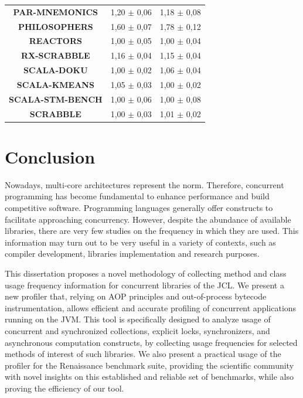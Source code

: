 \documentclass[]{usiinfthesis}
\begin{document}
\begin{table}
\begin{tabular}{|c|c|c|}
\textbf{	PAR-MNEMONICS	}&	 1,20 	 $\pm$ 	 0,06 	 & 	 1,18 	 $\pm$ 	 0,08 	\\
\textbf{	PHILOSOPHERS	}&	 1,60 	 $\pm$ 	 0,07 	 & 	 1,78 	 $\pm$ 	 0,12 	\\
\textbf{	REACTORS	}&	 1,00 	 $\pm$ 	 0,05 	 & 	 1,00 	 $\pm$ 	 0,04 	\\
\textbf{	RX-SCRABBLE	}&	 1,16 	 $\pm$ 	 0,04 	 & 	 1,15 	 $\pm$ 	 0,04 	\\
\textbf{	SCALA-DOKU	}&	 1,00 	 $\pm$ 	 0,02 	 & 	 1,06 	 $\pm$ 	 0,04 	\\
\textbf{	SCALA-KMEANS	}&	 1,05 	 $\pm$ 	 0,03 	 & 	 1,00 	 $\pm$ 	 0,02 	\\
\textbf{	SCALA-STM-BENCH	}&	 1,00 	 $\pm$ 	 0,06 	 & 	 1,00 	 $\pm$ 	 0,08 	\\
\textbf{	SCRABBLE	}&	 1,00 	 $\pm$ 	 0,03 	 & 	 1,01 	 $\pm$ 	 0,02 	\\

\hline
\end{tabular}
\end{table}%



\chapter{Conclusion}

Nowadays, multi-core architectures represent the norm. Therefore, concurrent programming has become fundamental to enhance performance and build competitive software. Programming languages generally offer constructs to facilitate approaching concurrency. However, despite the abundance of available libraries, there are very few studies on the frequency in which they are used. This information may turn out to be very useful in a variety of contexts, such as compiler development, libraries implementation and research purposes.

This dissertation proposes a novel methodology of collecting method and class usage frequency information for concurrent libraries of the JCL. We present a new profiler that, relying on AOP principles and out-of-process bytecode instrumentation, allows efficient and accurate profiling of concurrent applications running on the JVM. This tool is specifically designed to analyze usage of concurrent and synchronized collections, explicit locks, synchronizers, and asynchronous computation constructs, by collecting usage frequencies for selected methods of interest of such libraries. We also present a practical usage of the profiler for the Renaissance benchmark suite, providing the scientific community with novel insights on this established and reliable set of benchmarks, while also proving the efficiency of our tool.
\end{document}
